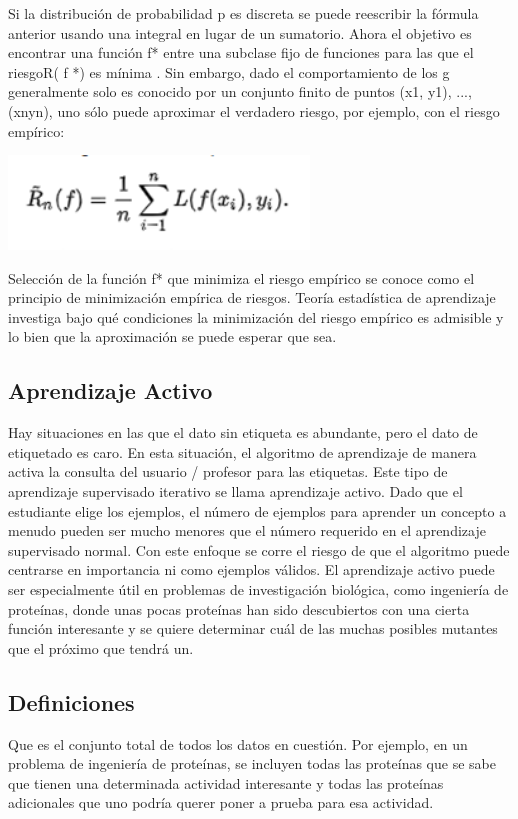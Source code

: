 \documentclass[12pt,a4paper]{report}
\begin{document}
Si la distribución de probabilidad p es discreta se puede reescribir la fórmula anterior usando una integral en lugar de un sumatorio.
Ahora el objetivo es encontrar una función f* entre una subclase fijo de funciones para las que el riesgoR( f *) es mínima .
Sin embargo, dado el comportamiento de los g generalmente solo es conocido por un conjunto finito de puntos (x1, y1), ..., (xnyn), uno sólo puede aproximar el verdadero riesgo, por ejemplo, con el riesgo empírico:

\includegraphics[width=8cm]{./images/3}\par\vspace{1cm}

Selección de la función f* que minimiza el riesgo empírico se conoce como el principio de minimización empírica de riesgos. Teoría estadística de aprendizaje investiga bajo qué condiciones la minimización del riesgo empírico es admisible y lo bien que la aproximación se puede esperar que sea.

\subsection{Aprendizaje Activo}
Hay situaciones en las que el dato sin etiqueta es abundante, pero el dato de etiquetado es caro. En esta situación, el algoritmo de aprendizaje de manera activa la consulta del usuario / profesor para las etiquetas. Este tipo de aprendizaje supervisado iterativo se llama aprendizaje activo. Dado que el estudiante elige los ejemplos, el número de ejemplos para aprender un concepto a menudo pueden ser mucho menores que el número requerido en el aprendizaje supervisado normal. Con este enfoque se corre el riesgo de que el algoritmo puede centrarse en importancia ni como ejemplos válidos.
El aprendizaje activo puede ser especialmente útil en problemas de investigación biológica, como ingeniería de proteínas, donde unas pocas proteínas han sido descubiertos con una cierta función interesante y se quiere determinar cuál de las muchas posibles mutantes que el próximo que tendrá un. 

\subsection{Definiciones}
Que es el conjunto total de todos los datos en cuestión. Por ejemplo, en un problema de ingeniería de proteínas,  se incluyen todas las proteínas que se sabe que tienen una determinada actividad interesante y todas las proteínas adicionales que uno podría querer poner a prueba para esa actividad.
\end{document}
